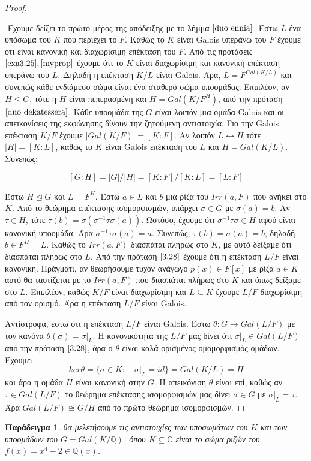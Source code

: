\documentclass[oneside,a4paper]{article}
\newtheorem{example}{Παράδειγμα}
\newcommand {\tl}{\textlatin}
\newcommand{\Q}{\mathbb{Q}}
\begin{document}
\begin{proof}$ $
	
	$ $\newline
	Έχουμε δείξει το πρώτο μέρος της απόδειξης με το λήμμα $\ref{duo ennia}$. Έστω $L$ ένα υπόσωμα του $K$ που περιέχει το $F$. Καθώς το $K$ είναι \tl{Galois} υπεράνω του $F$ έχουμε ότι είναι κανονική και διαχωρίσιμη επέκταση του $F$. Από τις προτάσεις $\ref{exa3.25},\ref{myprop}$ έχουμε ότι το $K$ είναι διαχωρίσιμη και κανονική επέκταση υπεράνω του $L$. Δηλαδή η επέκταση $K/L$ είναι \tl{Galois}. Άρα, $L = F^{Gal(K/L)}$ και συνεπώς κάθε ενδιάμεσο σώμα είναι ένα σταθερό σώμα υποομάδας. Επιπλέον, αν $H\leq G$, τότε η $H$ είναι πεπερασμένη και $H = Gal(K/F^H)$, από την πρόταση $\ref{duo dekatessera}$. Κάθε υποομάδα της $G$ είναι λοιπόν μια ομάδα \tl{Galois} και οι απεικονίσεις της εκφώνησης δίνουν την ζητούμενη αντιστοιχία. Για την \tl{Galois} επέκταση $K/F$ έχουμε $|Gal(K/F)| = [K:F]$. Αν λοιπόν $L \leftrightarrow H$ τότε $|H| = [K:L]$, καθώς το $K$ είναι \tl{Galois} επέκταση του $L$ και $H = Gal(K/L)$. Συνεπώς:
	
	$$[G:H] = |G|/|H| = [K:F] / [K:L] = [L:F]$$

	Έστω $H\unlhd G$ και $L = F^H$. Έστω $a \in L$ και $b$ μια ρίζα του $Irr(a,F)$ που ανήκει στο $K$. Από το θεώρημα επέκτασης ισομορφισμών, υπάρχει $\sigma \in G$ με $\sigma (a) = b$. Αν $\tau \in H$, τότε $\tau (b) = \sigma(\sigma^{-1} \tau \sigma (a))$. Ωστόσο, έχουμε ότι $\sigma^{-1} \tau \sigma \in H$ αφού είναι κανονική υποομάδα. Άρα $\sigma^{-1} \tau \sigma (a) = a$. Συνεπώς, $\tau (b) = \sigma (a) = b$, δηλαδή $b \in F^H = L$. Καθώς το $Irr(a,F)$ διασπάται πλήρως στο $K$, με αυτό δείξαμε ότι διασπάται πλήρως στο $L$. Από την πρόταση $\ref{3.28}$ έχουμε ότι η επέκταση $L/F$ είναι κανονική. Πράγματι, αν θεωρήσουμε τυχόν ανάγωγο $p(x) \in F[x]$ με ρίζα $a \in K$ αυτό θα ταυτίζεται με το $Irr(a,F)$ που διασπάται πλήρως στο $K$ και όπως δείξαμε στο $L$. Επιπλέον, καθώς $K/F$ είναι διαχωρίσιμη και $L \subseteq K$ έχουμε $L/F$ διαχωρίσιμη από τον ορισμό. Άρα η επέκταση $L/F$ είναι \tl{Galois}.

	Αντίστροφα, έστω ότι η επέκταση $L/F$ είναι \tl{Galois}. Έστω $\theta : G \rightarrow Gal(L/F)$ με τον κανόνα $\theta (\sigma) = \sigma|_L$. Η κανονικότητα της $L/F$ μας δίνει ότι $\sigma|_L \in Gal(L/F)$ από την πρόταση $\ref{3.28}$, άρα ο $\theta$ είναι καλά ορισμένος ομομορφισμός ομάδων. Έχουμε:
	$$ker \theta = \{\sigma \in K: \quad \sigma|_L = id\} = Gal(K/L) = H$$
	και άρα η ομάδα $H$ είναι κανονική στην $G$. Η απεικόνιση $\theta$ είναι επί, καθώς αν $\tau \in Gal(L/F)$ το θεώρημα επέκτασης ισομορφισμών μας δίνει $\sigma \in G$ με $\sigma|_L = \tau$. Άρα $Gal(L/F) \cong G/H$ από το πρώτο θεώρημα ισομορφισμών. 
\end{proof}
\begin{example}
θα μελετήσουμε τις αντιστοιχίες των υποσωμάτων του $K$ και των υποομάδων του $G=Gal(K/ \Q )$, όπου $K \subseteq \mathbb C$ είναι το σώμα ριζών του $f(x) = x^4 - 2 \in \Q (x)$.
\end{example}
\end{document}
